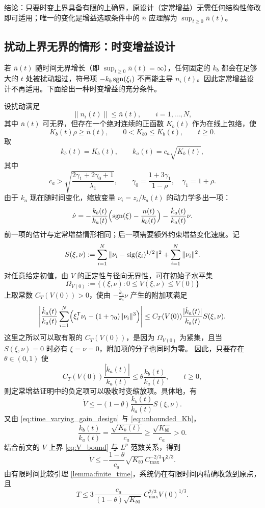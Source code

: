 结论：只要时变上界具备有限的上确界，原设计（定常增益）无需任何结构性修改即可适用；唯一的变化是增益选取条件中的 $\bar n$ 应理解为 $\sup_{t\ge0}\bar n(t)$。

\subsection{扰动上界无界的情形：时变增益设计}

若 $\bar n(t)$ 随时间无界增长（即 $\sup_{t\ge0}\bar n(t)=\infty$），任何固定的 $k_b$ 都会在足够大的 $t$ 处被扰动超过，符号项 $-k_b\operatorname{sgn}(\xi_i)$ 不再能主导 $n_i(t)$。因此定常增益设计不再适用。下面给出一种时变增益的充分条件。

设扰动满足
\[
    \|n_i(t)\|\le \bar n(t),\qquad i=1,\ldots,N,
\]
其中 $\bar n(t)$ 可无界，但存在一个绝对连续的正函数 $K_b(t)$ 作为在线上包络，使
\begin{equation}\label{eq:unbounded_Kb}
    K_b(t)\rho\ge \bar n(t),\qquad
    0<K_{b0}\le K_b(t),\qquad t\ge0 .
\end{equation}
取
\begin{equation}\label{eq:time_varying_gain_design}
    k_b(t)=K_b(t),\qquad
    k_a(t)=c_a\sqrt{K_b(t)},
\end{equation}
其中
\[
    c_a>\sqrt{\frac{2\gamma_1+2\gamma_0+1}{\lambda_1}},\qquad
    \gamma_0=\frac{1+3\gamma_1}{1-\rho},\quad \gamma_1=1+\rho .
\]
由于 $k_a$ 现在随时间变化，缩放变量 $\nu_i=z_i/k_a(t)$ 的动力学多出一项：
\[
    \dot\nu
    =-\frac{k_b(t)}{k_a(t)}\Bigl(\operatorname{sgn}(\xi)-\frac{n(t)}{k_b(t)}\Bigr)
    -\frac{\dot k_a(t)}{k_a(t)}\nu .
\]
前一项的估计与定常增益情形相同；后一项需要额外约束增益变化速度。记
\[
    S(\xi,\nu):=\sum_{i=1}^{N}\|\nu_i-\operatorname{sig}(\xi_i)^{1/2}\|^2+\sum_{i=1}^{N}\|\nu_i\|^2 .
\]
对任意给定初值，由 $V$ 的正定性与径向无界性，可在初始子水平集
\[
    \Omega_{V(0)}:=\{(\xi,\nu):0\le V(\xi,\nu)\le V(0)\}
\]
上取常数 $C_T(V(0))>0$，使由 $-\frac{\dot k_a}{k_a}\nu$ 产生的附加项满足
\begin{equation}\label{eq:time_varying_extra_bound}
    \left|
    \frac{\dot k_a(t)}{k_a(t)}
    \sum_{i=1}^{N}\Bigl(\xi_i^\mathsf T\nu_i-(1+\gamma_0)\|\nu_i\|^3\Bigr)
    \right|
    \le
    C_T(V(0))\frac{|\dot k_a(t)|}{k_a(t)}S(\xi,\nu).
\end{equation}
这里之所以可以取有限的 $C_T(V(0))$，是因为 $\Omega_{V(0)}$ 为紧集，且当 $S(\xi,\nu)=0$ 时必有 $\xi=\nu=0$，附加项的分子也同时为零。
因此，只要存在 $\theta\in(0,1)$ 使
\begin{equation}\label{eq:slow_gain_condition}
    C_T(V(0))\frac{|\dot k_a(t)|}{k_a(t)}
    \le
    \theta\frac{k_b(t)}{k_a(t)},\qquad t\ge0,
\end{equation}
则定常增益证明中的负定项可以吸收时变缩放项。具体地，有
\[
    \dot V
    \le
    -(1-\theta)\frac{k_b(t)}{k_a(t)}S(\xi,\nu).
\]
又由 \eqref{eq:time_varying_gain_design} 与 \eqref{eq:unbounded_Kb}，
\[
    \frac{k_b(t)}{k_a(t)}
    =\frac{\sqrt{K_b(t)}}{c_a}
    \ge \frac{\sqrt{K_{b0}}}{c_a}>0.
\]
结合前文的 $V$ 上界 \eqref{eq:V_bound} 与 $L^p$ 范数关系，得到
\[
    \dot V
    \le
    -\frac{1-\theta}{c_a}\sqrt{K_{b0}}\,
    C_{\max}^{-2/3}V^{2/3}.
\]
由有限时间比较引理 \ref{lemma:finite_time}，系统仍在有限时间内精确收敛到原点，且
\[
    T
    \le
    3\,\frac{c_a}{(1-\theta)\sqrt{K_{b0}}}\,
    C_{\max}^{2/3}V(0)^{1/3}.
\]

